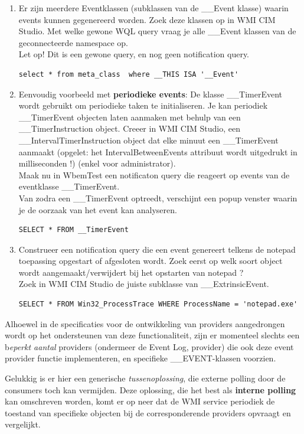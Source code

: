 \documentclass[11pt,a4paper]{report}
\begin{document}
\begin{enumerate}[resume]
	\item Er zijn meerdere Eventklassen (subklassen van de \_\_Event klasse) waarin events kunnen gegenereerd worden. Zoek deze klassen op in WMI CIM Studio.
	Met welke gewone WQL query vraag je alle \_\_Event klassen van de geconnecteerde namespace op.\\
	Let op! Dit is een gewone query, en nog geen notification query.
	\begin{lstlisting}
select * from meta_class  where __THIS ISA '__Event'
	\end{lstlisting}
	\item Eenvoudig voorbeeld met \textbf{periodieke events}: De klasse \_\_TimerEvent wordt gebruikt om periodieke taken te initialiseren. Je kan periodiek \_\_TimerEvent objecten laten aanmaken met behulp van een \_\_TimerInstruction object. Creeer in WMI CIM Studio, een \_\_IntervalTimerInstruction object dat elke minuut een \_\_TimerEvent aanmaakt (opgelet: het IntervalBetweenEvents attribuut wordt uitgedrukt in milliseconden !) (enkel voor administrator).\\
	Maak nu in WbemTest een notificaton query die reageert op events van de eventklasse \_\_TimerEvent.\\
	Van zodra een \_\_TimerEvent optreedt, verschijnt een popup venster waarin je de oorzaak van het event kan analyseren.
	\begin{lstlisting}
SELECT * FROM __TimerEvent
	\end{lstlisting}
	\item Construeer een notification query die een event genereert telkens de notepad toepassing opgestart of afgesloten wordt. Zoek eerst op welk soort object wordt aangemaakt/verwijdert bij het opstarten van notepad ?\\
	Zoek in WMI CIM Studio de juiste subklasse van \_\_ExtrinsicEvent.
	\begin{lstlisting}
SELECT * FROM Win32_ProcessTrace WHERE ProcessName = 'notepad.exe'
	\end{lstlisting}
\end{enumerate}
Alhoewel in de specificaties voor de ontwikkeling van providers aangedrongen wordt op het ondersteunen van deze functionaliteit, zijn er momenteel slechts een b\textit{eperkt aantal }providers (ondermeer de Event Log, provider) die ook deze event provider functie implementeren, en specifieke \_\_EVENT-klassen voorzien.
\par Gelukkig is er hier een generische \textit{tussenoplossing}, die externe polling door de consumers toch kan vermijden. Deze oplossing, die het best als \textbf{interne polling} kan omschreven worden, komt er op neer dat de WMI service periodiek de toestand van specifieke objecten bij de corresponderende providers opvraagt en vergelijkt.
\end{document}
